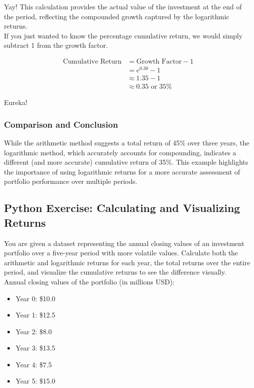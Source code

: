 \documentclass{article}
\begin{document}
Yay! This calculation provides the actual value of the investment at the end of the period, reflecting the compounded growth captured by the logarithmic returns. \\

If you just wanted to know the percentage cumulative return, we would simply subtract 1 from the growth factor.

\begin{align*}
    \text{Cumulative Return} &= \text{Growth Factor} - 1 \\
                             &= e^{0.30} - 1 \\
                             &\approx 1.35 - 1 \\
                             &\approx 0.35 \text{ or } 35\%
\end{align*}

Eureka!

\subsubsection{Comparison and Conclusion}

While the arithmetic method suggests a total return of 45\% over three years, the logarithmic method, which accurately accounts for compounding, indicates a different (and more accurate) cumulative return of 35\%. This example highlights the importance of using logarithmic returns for a more accurate assessment of portfolio performance over multiple periods.

\subsection{Python Exercise: Calculating and Visualizing Returns}

You are given a dataset representing the annual closing values of an investment portfolio over a five-year period with more volatile values. Calculate both the arithmetic and logarithmic returns for each year, the total returns over the entire period, and visualize the cumulative returns to see the difference visually. \\

Annual closing values of the portfolio (in millions USD):

\begin{itemize}
    \item Year 0: \$10.0
    \item Year 1: \$12.5
    \item Year 2: \$8.0
    \item Year 3: \$13.5
    \item Year 4: \$7.5
    \item Year 5: \$15.0
\end{itemize}
\end{document}
